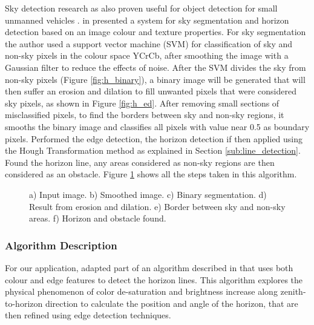 Sky detection research as also proven useful for object detection for small unmanned vehicles \cite{mcgee2005obstacle}. \citeauthor{mcgee2005obstacle} in \cite{mcgee2005obstacle} presented a system for sky segmentation and horizon detection based on an image colour and texture properties.
For sky segmentation the author used a support vector machine (SVM) for classification of sky and non-sky pixels in the colour space YCrCb, after smoothing the image with a Gaussian filter to reduce the effects of noise. After the SVM divides the sky from non-sky pixels (Figure \ref{fig:h_binary}), a binary image will be generated that will then suffer an erosion and dilation to fill unwanted pixels that were considered sky pixels, as shown in Figure \ref{fig:h_ed}. After removing small sections of misclassified pixels, to find the borders between sky and non-sky regions, it smooths the binary image and classifies all pixels with value near 0.5 as boundary pixels. Performed the edge detection, the horizon detection if then applied using the Hough Transformation method as explained in Section \ref{sub:line_detection}. Found the horizon line, any areas considered as non-sky regions are then considered as an obstacle. Figure \ref{fig:horizon} shows all the steps taken in this algorithm.
\begin{figure}[htbp]
	\centering
    \caption{a) Input image. b) Smoothed image. c) Binary segmentation. d) Result from erosion and dilation. e) Border between sky and non-sky areas. f) Horizon and obstacle found.}
    \label{fig:horizon}
\end{figure}

\subsubsection{Algorithm Description}
For our application, adapted part of an algorithm described in \cite{zafarifar2008horizon} that uses both colour and edge features to detect the horizon lines. This algorithm explores the physical phenomenon of color de-saturation and brightness increase along zenith-to-horizon direction to calculate the position and angle of the horizon, that are then refined using edge detection techniques.

